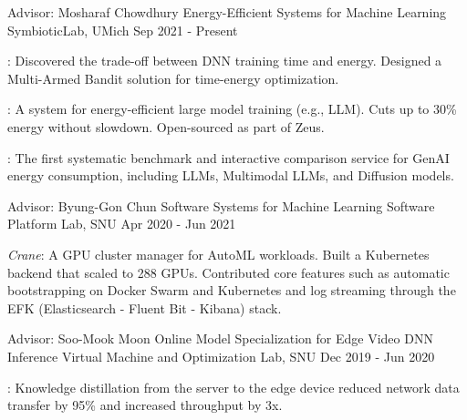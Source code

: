 

\begin{cventries}

  \cventryexp
    {Advisor: Mosharaf Chowdhury}
    {Energy-Efficient Systems for Machine Learning}
    {SymbioticLab, UMich}
    {Sep 2021 - Present}
    {
      \begin{cvitems}
        \item {\href{https://ml.energy/zeus}{}: Discovered the trade-off between DNN training time and energy. Designed a Multi-Armed Bandit solution for time-energy optimization.}
        \item {\href{https://ml.energy/zeus/research\_overview/perseus}{}: A system for energy-efficient large model training (e.g., LLM). Cuts up to 30\% energy without slowdown. Open-sourced as part of Zeus.}
        \item {\href{https://ml.energy/leaderboard}{}: The first systematic benchmark and interactive comparison service for GenAI energy consumption, including LLMs, Multimodal LLMs, and Diffusion models.}
      \end{cvitems}
    }
    
  \cventryexp
    {Advisor: Byung-Gon Chun}
    {Software Systems for Machine Learning}
    {Software Platform Lab, SNU}
    {Apr 2020 - Jun 2021}
    {
      \begin{cvitems}
        \item {\textit{Crane}: A GPU cluster manager for AutoML workloads. Built a Kubernetes backend that scaled to 288 GPUs. Contributed core features such as automatic bootstrapping on Docker Swarm and Kubernetes and log streaming through the EFK (Elasticsearch - Fluent Bit - Kibana) stack.}
      \end{cvitems}
    }
    
  \cventryexp
    {Advisor: Soo-Mook Moon}
    {Online Model Specialization for Edge Video DNN Inference}
    {Virtual Machine and Optimization Lab, SNU}
    {Dec 2019 - Jun 2020}
    {
      \begin{cvitems}
      \item {\href{https://github.com/jaywonchung/shadowtutor}{}: Knowledge distillation from the server to the edge device reduced network data transfer by 95\% and increased throughput by 3x.}
      \end{cvitems}
    }
    

\end{cventries}
